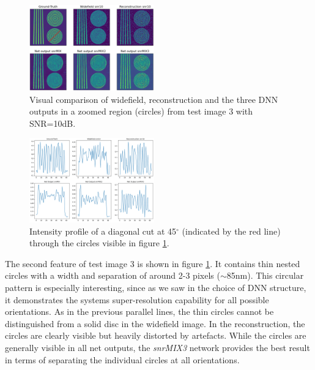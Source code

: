 \documentclass[conference]{IEEEtran}
\begin{document}
\begin{figure}[h]
    \centering
    \vspace{0.47cm}
    \includegraphics[width=0.48\textwidth]{images/test_img_3_model_comp_snr10_circle_line.png}
    \caption{Visual comparison of widefield, reconstruction and the three DNN outputs in a zoomed region (circles) from test image 3 with SNR=10dB.}
    \label{fig:test_img_3_model_comp_snr10_circle}
\end{figure}
\begin{figure}[h]
    \centering
    \vspace{0.2cm}
    \includegraphics[width=0.48\textwidth]{images/test_img_3_model_comp_snr10_circle_cut.png}
    \caption{Intensity profile of a diagonal cut at 45$^\circ$ (indicated by the red line) through the circles visible in figure \ref{fig:test_img_3_model_comp_snr10_circle}.}
    \label{fig:test_img_3_model_comp_snr10_cirlce_cut}
\end{figure}

The second feature of test image 3 is shown in figure \ref{fig:test_img_3_model_comp_snr10_circle}. It contains thin nested circles with a width and separation of around 2-3 pixels ($\sim$85nm). This circular pattern is especially interesting, since as we saw in the choice of DNN structure, it demonstrates the systems super-resolution capability for all possible orientations. As in the previous parallel lines, the thin circles cannot be distinguished from a solid disc in the widefield image. In the reconstruction, the circles are clearly visible but heavily distorted by artefacts. While the circles are generally visible in all net outputs, the \textit{snrMIX3} network provides the best result in terms of separating the individual circles at all orientations.
\end{document}
